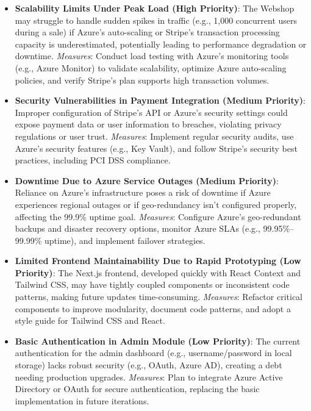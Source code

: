 \begin{itemize}
  \item \textbf{Scalability Limits Under Peak Load (High Priority)}: The Webshop may struggle to handle sudden spikes in traffic (e.g., 1,000 concurrent users during a sale) if Azure’s auto-scaling or Stripe’s transaction processing capacity is underestimated, potentially leading to performance degradation or downtime.  
    \textit{Measures}: Conduct load testing with Azure’s monitoring tools (e.g., Azure Monitor) to validate scalability, optimize Azure auto-scaling policies, and verify Stripe’s plan supports high transaction volumes.

  \item \textbf{Security Vulnerabilities in Payment Integration (Medium Priority)}: Improper configuration of Stripe’s API or Azure’s security settings could expose payment data or user information to breaches, violating privacy regulations or user trust.  
    \textit{Measures}: Implement regular security audits, use Azure’s security features (e.g., Key Vault), and follow Stripe’s security best practices, including PCI DSS compliance.

  \item \textbf{Downtime Due to Azure Service Outages (Medium Priority)}: Reliance on Azure’s infrastructure poses a risk of downtime if Azure experiences regional outages or if geo-redundancy isn’t configured properly, affecting the 99.9\% uptime goal.  
    \textit{Measures}: Configure Azure’s geo-redundant backups and disaster recovery options, monitor Azure SLAs (e.g., 99.95\%–99.99\% uptime), and implement failover strategies.

  \item \textbf{Limited Frontend Maintainability Due to Rapid Prototyping (Low Priority)}: The Next.js frontend, developed quickly with React Context and Tailwind CSS, may have tightly coupled components or inconsistent code patterns, making future updates time-consuming.  
    \textit{Measures}: Refactor critical components to improve modularity, document code patterns, and adopt a style guide for Tailwind CSS and React.

  \item \textbf{Basic Authentication in Admin Module (Low Priority)}: The current authentication for the admin dashboard (e.g., username/password in local storage) lacks robust security (e.g., OAuth, Azure AD), creating a debt needing production upgrades.  
    \textit{Measures}: Plan to integrate Azure Active Directory or OAuth for secure authentication, replacing the basic implementation in future iterations.
\end{itemize}